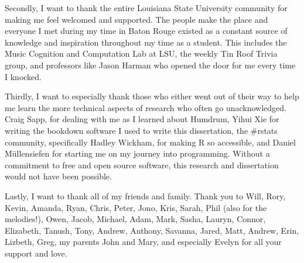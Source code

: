 Secondly, I want to thank the entire Louisiana State University community for making me feel welcomed and supported.
The people make the place and everyone I met during my time in Baton Rouge existed as a constant source of knowledge and inspiration throughout my time as a student.
This includes the Music Cognition and Computation Lab at LSU, the weekly Tin Roof Trivia group, and professors like Jason Harman  who opened the door for me every time I knocked.

Thirdly, I want to especially thank those who either went out of their way to help me learn the more technical aspects of research who often go unacknowledged.
Craig Sapp, for dealing with me as I learned about Humdrum, Yihui Xie for writing the bookdown software I used to write this dissertation, the \#rstats community, specifically Hadley Wickham, for making R so accessible, and Daniel Müllensiefen for starting me on my journey into programming.
Without a commitment to free and open source software, this research and dissertation would not have been possible.

Lastly, I want to thank all of my friends and family.
Thank you to Will, Rory, Kevin, Amanda, Ryan, Chris, Peter, Jono, Kris, Sarah, Phil (also for the melodies!), Owen, Jacob, Michael, Adam, Mark, Sasha, Lauryn, Connor, Elizabeth, Tanush, Tony, Andrew, Anthony, Savanna, Jared, Matt, Andrew, Erin, Lizbeth, Greg, my parents John and Mary, and especially Evelyn for all your support and love.

